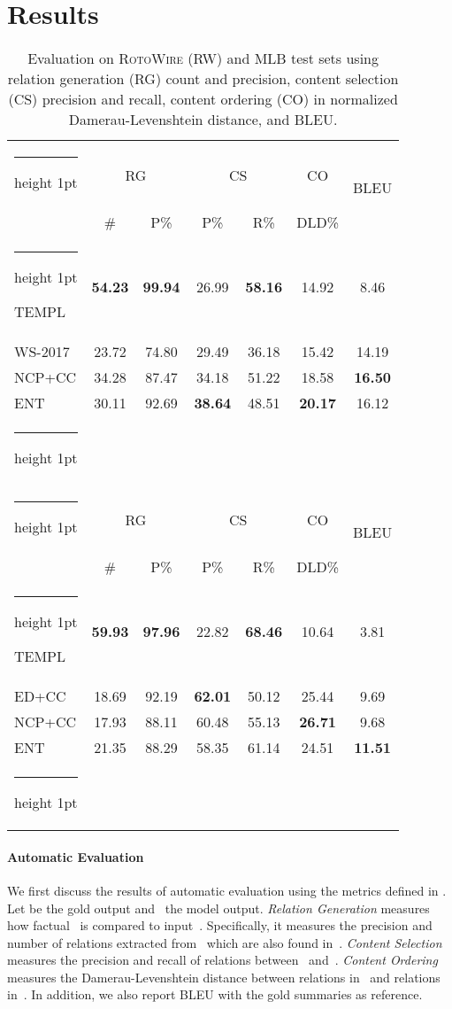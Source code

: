 \documentclass[11pt,a4paper]{article}
\makeatletter
\newcommand{\thickhline}{\noalign {\ifnum 0=`}\fi \hrule height 1pt
    \futurelet \reserved@a \@xhline
}
\makeatother
\begin{document}
\section{Results}
\label{sec:results}


\begin{table}[t]
\small
\centering
\begin{tabular}{@{~}l@{~}|@{~}c@{~~~}c@{~}|c@{~~~}c|c|@{~}c@{~} } 
 \thickhline
 \multirow{2}{*}{\textsc{RW}} &\multicolumn{2}{c|}{RG} &\multicolumn{2}{c|}{CS} & CO & \multirow{2}{*}{BLEU}\\ 
 &\# & P\% & P\% & R\% & DLD\% & \\ \thickhline
TEMPL &\textbf{54.23} &\textbf{99.94} &26.99 &\textbf{58.16} &14.92 &\hspace*{1ex}8.46  \\
WS-2017 & 23.72 & 74.80 & 29.49 & 36.18 & 15.42 & 14.19 \\NCP+CC &{34.28} & {87.47} & 34.18 & {51.22}
 &18.58 & \textbf{16.50}\\ ENT&30.11 &92.69 & \textbf{38.64} & 48.51 & \textbf{20.17} & 16.12 \\
\thickhline
\multicolumn{7}{c}{} \\ \thickhline
 \multirow{2}{*}{MLB} &\multicolumn{2}{c|}{RG} &\multicolumn{2}{c|}{CS} & CO & \multirow{2}{*}{BLEU}\\

 &\# & P\% & P\% & R\% & DLD\% & \\ \thickhline
TEMPL & \textbf{59.93} & \textbf{97.96} & 22.82 & \textbf{68.46} & 10.64 & 3.81 \\
ED+CC & 18.69 & 92.19 & \textbf{62.01} & 50.12 & 25.44 & 9.69 \\
NCP+CC& 17.93 & 88.11 & 60.48 & 55.13 & \textbf{26.71} & 9.68 \\
ENT&21.35 & 88.29 & 58.35 & {61.14}
 &24.51 & \textbf{11.51}\\ \hline \thickhline
\end{tabular}
\caption{\label{tbl:mlb-with-ie-test}  Evaluation
  on  \textsc{RotoWire} (RW) and \textsc{MLB} test sets using 
  relation generation (RG)  count and precision, content
  selection (CS) precision and recall, content ordering (CO) in normalized
  Damerau-Levenshtein distance, and BLEU.} 
\end{table}



\paragraph{Automatic Evaluation}
We first discuss the results of automatic evaluation using the metrics
defined in .  Let  be the gold output and
~the model output.  \emph{Relation Generation} measures how
factual~ is compared to input~. Specifically, it measures the
precision and number of relations extracted from~ which are also
found in~. \emph{Content Selection} measures the precision and
recall of relations between~ and~. \emph{Content Ordering}
measures the Damerau-Levenshtein distance between relations in~ and
relations in~. In addition, we also report BLEU
\cite{P02-1040} with the gold summaries as reference.
\end{document}
